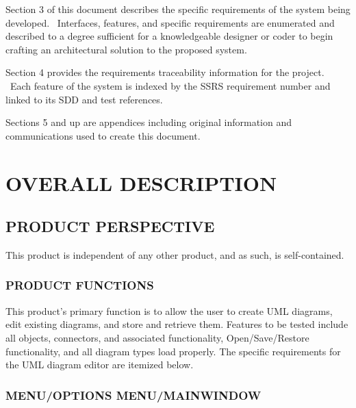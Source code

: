 \documentclass[twoside,letterpaper]{article}
\begin{document}
\bigskip

{
Section 3 of this document describes the specific requirements of the
system being developed. \ Interfaces, features, and specific
requirements are enumerated and described to a degree sufficient for a
knowledgeable designer or coder to begin crafting an architectural
solution to the proposed system.}


\bigskip

{
Section 4 provides the requirements traceability information for the
project. \ Each feature of the system is indexed by the SSRS
requirement number and linked to its SDD and test references.}


\bigskip

{
Sections 5 and up are appendices including original information and
communications used to create this document.}











\clearpage\section[OVERALL DESCRIPTION]{\rmfamily\bfseries
OVERALL DESCRIPTION}

\subsection[PRODUCT PERSPECTIVE]{\rmfamily\bfseries
PRODUCT PERSPECTIVE}
{
This product is independent of any other product, and as such, is self-contained.
}

\subsubsection[PRODUCT FUNCTIONS]{\rmfamily\bfseries
PRODUCT FUNCTIONS}

This product's primary function is to allow the user to create UML diagrams, edit existing diagrams, and store and retrieve them.
\newline Features to be tested include all objects, connectors, and associated functionality, Open/Save/Restore functionality, and all diagram types load properly. The specific requirements for the UML diagram editor are itemized below.


\subsubsection[MENU/OPTIONS MENU/MAINWINDOW]{\bfseries MENU/OPTIONS MENU/MAINWINDOW} 
\end{document}
